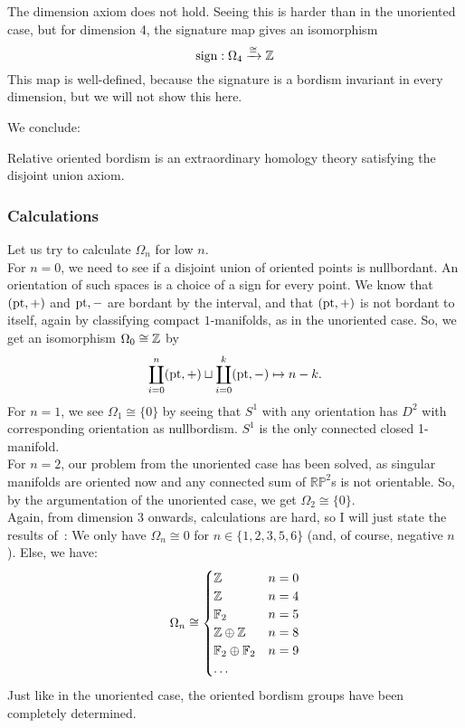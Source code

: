 \documentclass[a4paper,11pt]{article}
\begin{document}

\begin{remark}
    The dimension axiom does not hold. Seeing this is harder than in the unoriented case, but for dimension 4, the signature map gives an isomorphism
    \[\mathrm{sign}:\Omega_4\xrightarrow{\cong}\mathbb{Z}\]
    This map is well-defined, because the signature is a bordism invariant in every dimension, but we will not show this here.
\end{remark}

We conclude:
\begin{theorem}
    Relative oriented bordism is an extraordinary homology theory satisfying the disjoint union axiom.
\end{theorem}

\subsubsection{Calculations}

Let us try to calculate \(\Omega_n\) for low \(n\).\\
For \(n=0\), we need to see if a disjoint union of oriented points is nullbordant. An orientation of such spaces is a choice of a sign for every point. We know that \((\mathrm{pt},+)\) and \(\mathrm{pt},-\) are bordant by the interval, and that \((\mathrm{pt},+)\) is not bordant to itself, again by classifying compact \(1\)-manifolds, as in the unoriented case. So, we get an isomorphism \(\Omega_0\cong\mathbb{Z}\) by \[\coprod_{i=0}^n(\mathrm{pt},+)\sqcup\coprod_{i=0}^k(\mathrm{pt},-)\mapsto n-k.\]
For \(n=1\), we see \(\Omega_1\cong\{0\}\) by seeing that \(S^1\) with any orientation has \(D^2\) with corresponding orientation as nullbordism. \(S^1\) is the only connected closed 1-manifold.\\
For \(n=2\), our problem from the unoriented case has been solved, as singular manifolds are oriented now and any connected sum of \(\mathbb{RP}^2\)s is not orientable. So, by the argumentation of the unoriented case, we get \(\Omega_2\cong\{0\}\).\\
Again, from dimension 3 onwards, calculations are hard, so I will just state the results of\ \cite[\S 17]{stasheff}: We only have \(\Omega_n\cong 0\) for \(n\in\{1,2,3,5,6\}\) (and, of course, negative \(n\)). Else, we have:
\[\Omega_n\cong\begin{cases}\mathbb{Z} & n=0\\
\mathbb{Z} & n=4\\
\mathbb{F}_2 & n=5\\
\mathbb{Z}\oplus\mathbb{Z} & n=8\\
\mathbb{F}_2\oplus\mathbb{F}_2 & n=9\\
\dots
\end{cases}\]
Just like in the unoriented case, the oriented bordism groups have been completely determined.
\end{document}
